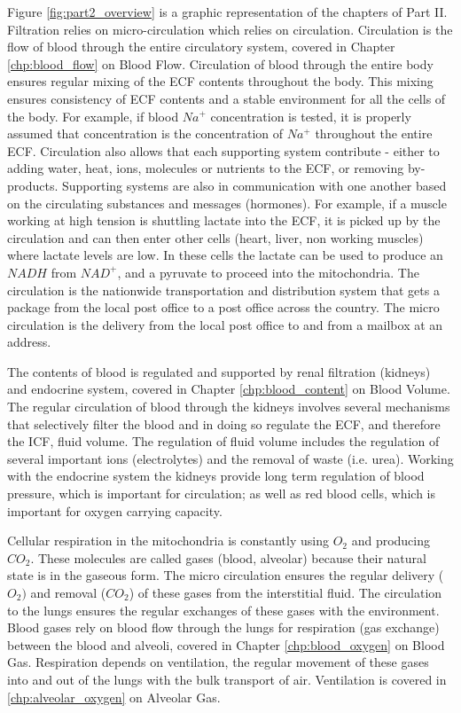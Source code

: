 Figure \ref{fig:part2_overview} is a graphic representation of the chapters of Part II. Filtration relies on micro-circulation which relies on circulation. Circulation is the flow of blood through the entire circulatory system, covered in Chapter \ref{chp:blood_flow} on Blood Flow. Circulation of blood through the entire body ensures regular mixing of the ECF contents throughout the body. This mixing ensures consistency of ECF contents and a stable environment for all the cells of the body. For example, if blood $Na^+$ concentration is tested, it is properly assumed that concentration is the concentration of $Na^+$ throughout the entire ECF. Circulation also allows that each supporting system contribute - either to adding water, heat, ions, molecules or nutrients to the ECF, or removing by-products. Supporting systems are also in communication with one another based on the circulating substances and messages (hormones). For example, if a muscle working at high tension is shuttling lactate into the ECF, it is picked up by the circulation and can then enter other cells (heart, liver, non working muscles) where lactate levels are low. In these cells the lactate can be used to produce an $NADH$ from $NAD^+$, and a pyruvate to proceed into the mitochondria. The circulation is the nationwide transportation and distribution system that gets a package from the local post office to a post office across the country. The micro circulation is the delivery from the local post office to and from a mailbox at an address.

The contents of blood is regulated and supported by renal filtration (kidneys) and endocrine system, covered in Chapter \ref{chp:blood_content} on Blood Volume. The regular circulation of blood through the kidneys involves several mechanisms that selectively filter the blood and in doing so regulate the ECF, and therefore the ICF, fluid volume. The regulation of fluid volume includes the regulation of several important ions (electrolytes) and the removal of waste (i.e. urea). Working with the endocrine system the kidneys provide long term regulation of blood pressure, which is important for circulation; as well as red blood cells, which is important for oxygen carrying capacity.

Cellular respiration in the mitochondria is constantly using $O_2$ and producing $CO_2$. These molecules are called gases (blood, alveolar) because their natural state is in the gaseous form. The micro circulation ensures the regular delivery ($O_2)$ and removal ($CO_2$) of these gases from the interstitial fluid. The circulation to the lungs ensures the regular exchanges of these gases with the environment. Blood gases rely on blood flow through the lungs for respiration (gas exchange) between the blood and alveoli, covered in Chapter \ref{chp:blood_oxygen} on Blood Gas. Respiration depends on ventilation, the regular movement of these gases into and out of the lungs with the bulk transport of air. Ventilation is covered in \ref{chp:alveolar_oxygen} on Alveolar Gas. 

